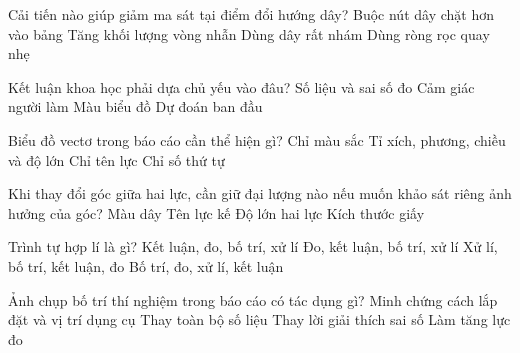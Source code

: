 \begin{ex}
Cải tiến nào giúp giảm ma sát tại điểm đổi hướng dây?
\choice
{Buộc nút dây chặt hơn vào bảng}
{Tăng khối lượng vòng nhẫn}
{Dùng dây rất nhám}
{\True Dùng ròng rọc quay nhẹ}
\end{ex}

\begin{ex}
Kết luận khoa học phải dựa chủ yếu vào đâu?
\choice
{\True Số liệu và sai số đo}
{Cảm giác người làm}
{Màu biểu đồ}
{Dự đoán ban đầu}
\end{ex}

\begin{ex}
Biểu đồ vectơ trong báo cáo cần thể hiện gì?
\choice
{Chỉ màu sắc}
{\True Tỉ xích, phương, chiều và độ lớn}
{Chỉ tên lực}
{Chỉ số thứ tự}
\end{ex}

\begin{ex}
Khi thay đổi góc giữa hai lực, cần giữ đại lượng nào nếu muốn khảo sát riêng ảnh hưởng của góc?
\choice
{Màu dây}
{Tên lực kế}
{\True Độ lớn hai lực}
{Kích thước giấy}
\end{ex}

\begin{ex}
Trình tự hợp lí là gì?
\choice
{Kết luận, đo, bố trí, xử lí}
{Đo, kết luận, bố trí, xử lí}
{Xử lí, bố trí, kết luận, đo}
{\True Bố trí, đo, xử lí, kết luận}
\end{ex}

\begin{ex}
Ảnh chụp bố trí thí nghiệm trong báo cáo có tác dụng gì?
\choice
{\True Minh chứng cách lắp đặt và vị trí dụng cụ}
{Thay toàn bộ số liệu}
{Thay lời giải thích sai số}
{Làm tăng lực đo}
\end{ex}

